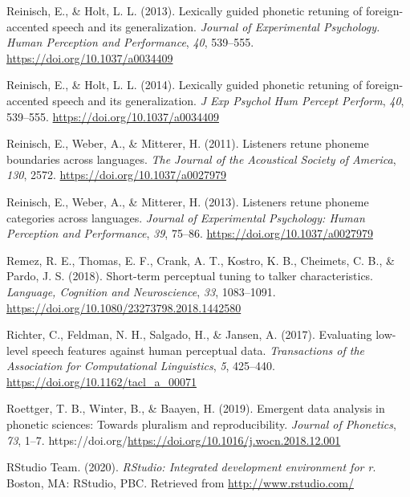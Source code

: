 \documentclass[
  11pt,
  english,
  man,floatsintext]{apa6}
\newlength{\cslhangindent}
\newlength{\cslentryspacingunit} %
\newenvironment{CSLReferences}[2] %
 {%
  \setlength{\parindent}{0pt}
  \ifodd #1
  \let\oldpar\par
  \def\par{\hangindent=\cslhangindent\oldpar}
  \fi
  \setlength{\parskip}{#2\cslentryspacingunit}
 }%
 {}
\begin{document}
\begin{CSLReferences}{1}{0}
\leavevmode{}%
Reinisch, E., \& Holt, L. L. (2013). Lexically guided phonetic retuning of foreign-accented speech and its generalization. \emph{Journal of Experimental Psychology. Human Perception and Performance}, \emph{40}, 539--555. \url{https://doi.org/10.1037/a0034409}

\leavevmode{}%
Reinisch, E., \& Holt, L. L. (2014). Lexically guided phonetic retuning of foreign-accented speech and its generalization. \emph{J Exp Psychol Hum Percept Perform}, \emph{40}, 539--555. \url{https://doi.org/10.1037/a0034409}

\leavevmode{}%
Reinisch, E., Weber, A., \& Mitterer, H. (2011). Listeners retune phoneme boundaries across languages. \emph{The Journal of the Acoustical Society of America}, \emph{130}, 2572. \url{https://doi.org/10.1037/a0027979}

\leavevmode{}%
Reinisch, E., Weber, A., \& Mitterer, H. (2013). Listeners retune phoneme categories across languages. \emph{Journal of Experimental Psychology: Human Perception and Performance}, \emph{39}, 75--86. \url{https://doi.org/10.1037/a0027979}

\leavevmode{}%
Remez, R. E., Thomas, E. F., Crank, A. T., Kostro, K. B., Cheimets, C. B., \& Pardo, J. S. (2018). Short-term perceptual tuning to talker characteristics. \emph{Language, Cognition and Neuroscience}, \emph{33}, 1083--1091. \url{https://doi.org/10.1080/23273798.2018.1442580}

\leavevmode{}%
Richter, C., Feldman, N. H., Salgado, H., \& Jansen, A. (2017). Evaluating low-level speech features against human perceptual data. \emph{Transactions of the Association for Computational Linguistics}, \emph{5}, 425--440. \url{https://doi.org/10.1162/tacl_a_00071}

\leavevmode{}%
Roettger, T. B., Winter, B., \& Baayen, H. (2019). Emergent data analysis in phonetic sciences: Towards pluralism and reproducibility. \emph{Journal of Phonetics}, \emph{73}, 1--7. https://doi.org/\url{https://doi.org/10.1016/j.wocn.2018.12.001}

\leavevmode{}%
RStudio Team. (2020). \emph{RStudio: Integrated development environment for r}. Boston, MA: RStudio, PBC. Retrieved from \url{http://www.rstudio.com/}


\end{CSLReferences}
\end{document}
